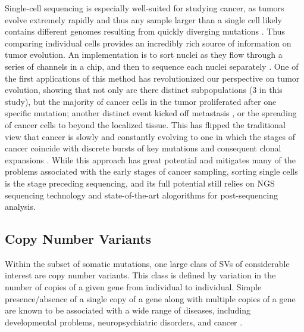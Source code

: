 \documentclass{easychithesis}
\begin{document}
Single-cell sequencing is especially well-suited for studying cancer, as tumors evolve extremely rapidly and thus any sample larger than a single cell likely contains different genomes resulting from quickly diverging mutations \cite{robison2010application, navin2011tumour}. Thus comparing individual cells provides an incredibly rich source of information on tumor evolution. An implementation is to sort nuclei as they flow through a series of channels in a chip, and then to sequence each nuclei separately \cite{navin2011tumour}. One of the first applications of this method has revolutionized our perspective on tumor evolution, showing that not only are there distinct subpopulations (3 in this study), but the majority of cancer cells in the tumor proliferated after one specific mutation; another distinct event kicked off metastasis \cite{navin2011tumour}, or the spreading of cancer cells to beyond the localized tissue. This has flipped the traditional view that cancer is slowly and  constantly evolving to one in which the stages of cancer coincide with discrete bursts of key mutations and consequent clonal expansions \cite{navin2011tumour}. While this approach has great potential and mitigates many of the problems associated with the early stages of cancer sampling, sorting single cells is the stage preceding sequencing, and its full potential still relies on NGS sequencing technology and state-of-the-art alogorithms for post-sequencing analysis.


\subsection{Copy Number Variants}
Within the subset of somatic mutations, one large class of SVs of considerable interest are copy number variants. This class is defined by variation in the number of copies of a given gene from individual to individual. Simple presence/absence of a single copy of a gene along with multiple copies of a gene are known to be associated with a wide range of diseases, including developmental problems, neuropsychiatric disorders, and cancer \cite{yoon2009sensitive}. 
\end{document}
